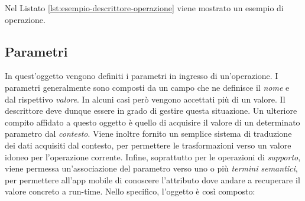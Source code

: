 Nel Listato \ref{lst:esempio-descrittore-operazione} viene mostrato un esempio di operazione.



\subsection{Parametri\label{sec:descrittore-parametri}}

In quest'oggetto vengono definiti i parametri in ingresso di un'operazione. I parametri generalmente sono composti da un campo che ne definisce il \emph{nome} e dal rispettivo \emph{valore}. In alcuni casi però vengono accettati più di un valore. Il descrittore deve dunque essere in grado di gestire questa situazione. Un ulteriore compito affidato a questo oggetto è quello di acquisire il valore di un determinato parametro dal \emph{contesto}. Viene inoltre fornito un semplice sistema di traduzione dei dati acquisiti dal contesto, per permettere le trasformazioni verso un valore idoneo per l'operazione corrente. Infine, soprattutto per le operazioni di \emph{supporto}, viene permessa un'associazione del parametro verso uno o più \emph{termini semantici}, per permettere all'app mobile di conoscere l'attributo dove andare a recuperare il valore concreto a run-time. Nello specifico, l'oggetto è così composto:

